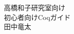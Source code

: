 \documentclass{jsbook}
\begin{document}
\begin{center}
{\Huge 高橋和子研究室向け\\
初心者向けCoqガイド}\\
田中竜太
\end{center}
\end{document}
